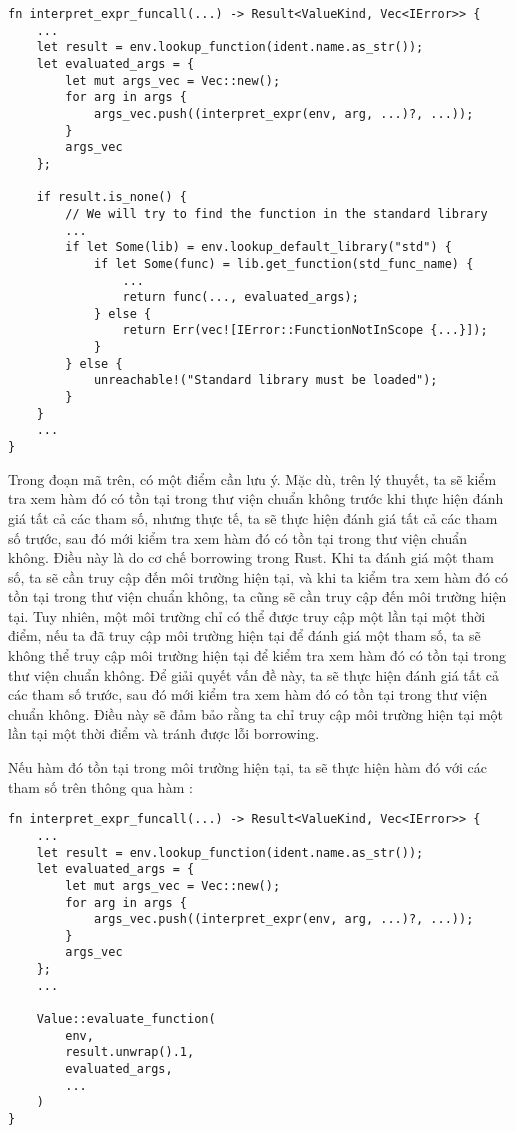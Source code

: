 \begin{lstlisting}[]
fn interpret_expr_funcall(...) -> Result<ValueKind, Vec<IError>> {
    ...
    let result = env.lookup_function(ident.name.as_str());
    let evaluated_args = {
        let mut args_vec = Vec::new();
        for arg in args {
            args_vec.push((interpret_expr(env, arg, ...)?, ...));
        }
        args_vec
    };

    if result.is_none() {
        // We will try to find the function in the standard library
        ...
        if let Some(lib) = env.lookup_default_library("std") {
            if let Some(func) = lib.get_function(std_func_name) {
                ...
                return func(..., evaluated_args);
            } else {
                return Err(vec![IError::FunctionNotInScope {...}]);
            }
        } else {
            unreachable!("Standard library must be loaded");
        }
    }
    ...
}
\end{lstlisting}

    Trong đoạn mã trên, có một điểm cần lưu ý. Mặc dù, trên lý thuyết, ta sẽ kiểm tra xem hàm đó có tồn tại trong thư viện chuẩn không trước khi thực hiện đánh giá tất cả các tham số, nhưng thực tế, ta sẽ thực hiện đánh giá tất cả các tham số trước, sau đó mới kiểm tra xem hàm đó có tồn tại trong thư viện chuẩn không. Điều này là do cơ chế borrowing trong Rust. Khi ta đánh giá một tham số, ta sẽ cần truy cập đến môi trường hiện tại, và khi ta kiểm tra xem hàm đó có tồn tại trong thư viện chuẩn không, ta cũng sẽ cần truy cập đến môi trường hiện tại. Tuy nhiên, một môi trường chỉ có thể được truy cập một lần tại một thời điểm, nếu ta đã truy cập môi trường hiện tại để đánh giá một tham số, ta sẽ không thể truy cập môi trường hiện tại để kiểm tra xem hàm đó có tồn tại trong thư viện chuẩn không. Để giải quyết vấn đề này, ta sẽ thực hiện đánh giá tất cả các tham số trước, sau đó mới kiểm tra xem hàm đó có tồn tại trong thư viện chuẩn không. Điều này sẽ đảm bảo rằng ta chỉ truy cập môi trường hiện tại một lần tại một thời điểm và tránh được lỗi borrowing.

    Nếu hàm đó tồn tại trong môi trường hiện tại, ta sẽ thực hiện hàm đó với các tham số trên thông qua hàm :

\begin{lstlisting}[]
fn interpret_expr_funcall(...) -> Result<ValueKind, Vec<IError>> {
    ...
    let result = env.lookup_function(ident.name.as_str());
    let evaluated_args = {
        let mut args_vec = Vec::new();
        for arg in args {
            args_vec.push((interpret_expr(env, arg, ...)?, ...));
        }
        args_vec
    };
    ...

    Value::evaluate_function(
        env,
        result.unwrap().1,
        evaluated_args,
        ...
    )
}
\end{lstlisting}

